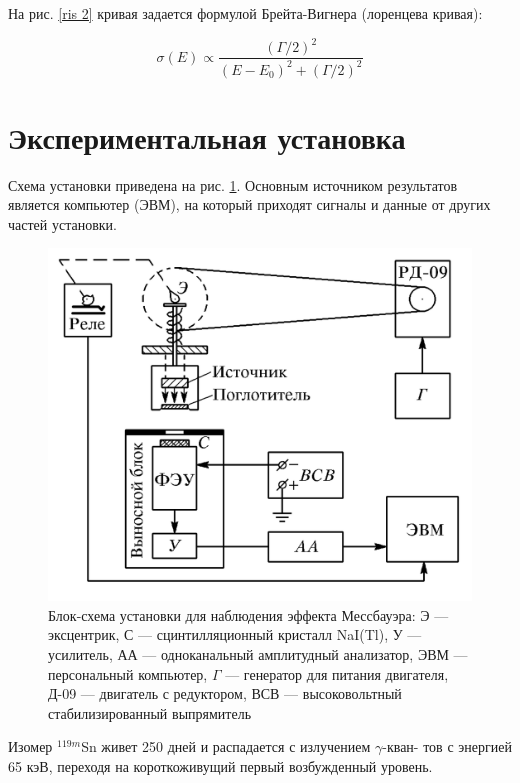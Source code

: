 \documentclass[12pt]{kiarticle} %
\begin{document}
	На рис. \ref{ris 2} кривая задается формулой Брейта-Вигнера (лоренцева кривая):
	
	\begin{equation}\label{B-V}
	\sigma(E) \propto \dfrac{(\Gamma/2)^2}{(E - E_0)^2 + (\Gamma/2)^2}
	\end{equation}
	
	\section{Экспериментальная установка}
	
	Схема установки приведена на рис. \ref{lab}. Основным источником результатов является компьютер (ЭВМ), на который приходят сигналы и данные от других частей установки. 
	
	\begin{figure}[h!]
		\centering
		\includegraphics[width=0.7\linewidth]{lab}
		\caption{Блок-схема установки для наблюдения эффекта Мессбауэра: Э --- эксцентрик, С --- сцинтилляционный кристалл NaI(Tl), У --- усилитель, АА --- одноканальный амплитудный анализатор, ЭВМ --- персональный компьютер, $ \Gamma $ --- генератор для питания двигателя, Д-09 --- двигатель с редуктором, ВСВ --- высоковольтный стабилизированный выпрямитель}
		\label{lab}
	\end{figure}
	
	Изомер $^{119m}$Sn живет 250
	дней и распадается с излучением $ \gamma $-кван-
	тов с энергией 65 кэВ, переходя на короткоживущий первый возбужденный уровень.
	
\end{document}
